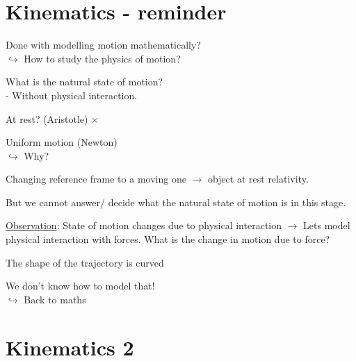 \documentclass[a4paper,12pt]{article}
\begin{document}
\section*{Kinematics - reminder}
\begin{list2}
	\item Done with modelling motion mathematically? \\ $\hookrightarrow$ How to study the physics of motion?
	\item What is the natural state of motion? \\ - Without physical interaction. 
	\item At rest? (Aristotle) $\times$
	\item Uniform motion (Newton) \\ $\hookrightarrow$ Why?
	\begin{listHook}
		\item Changing reference frame to a moving one $\rightarrow$ object at rest relativity. 
		\item But we cannot answer/ decide what the natural state of motion is in this stage.
	\end{listHook}
\end{list2}
\underline{Observation}: State of motion changes due to physical interaction $\rightarrow$ Lets model physical interaction with forces. 
What is the change in motion due to force?
\begin{list2}
	\item The shape of the trajectory is curved 
	\item We don't know how to model that! \\ $\hookrightarrow$ Back to maths
\end{list2}
\section*{Kinematics 2}
\end{document}
